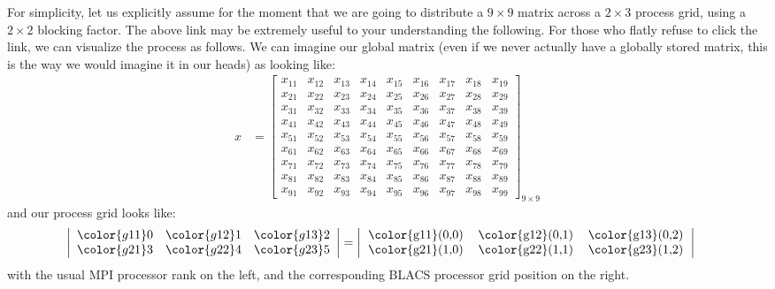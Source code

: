 For simplicity, let us explicitly assume for the moment that we are going to distribute a $9\times 9$ matrix across a $2\times 3$ process grid, using a $2\times 2$ blocking factor.  The above link may be extremely useful to your understanding the following.  For those who flatly refuse to click the link, we can visualize the process as follows.  We can imagine our global matrix (even if we never actually have a globally stored matrix, this is the way we would imagine it in our heads) as looking like:
\begin{align*}
x &= \left[
      \begin{array}{lllllllll}
      x_{11} & x_{12} & x_{13} & x_{14} & x_{15} & x_{16} & x_{17} & x	_{18} & x_{19}\\
      x_{21} & x_{22} & x_{23} & x_{24} & x_{25} & x_{26} & x_{27} & x	_{28} & x_{29}\\
      x_{31} & x_{32} & x_{33} & x_{34} & x_{35} & x_{36} & x_{37} & x	_{38} & x_{39}\\
      x_{41} & x_{42} & x_{43} & x_{44} & x_{45} & x_{46} & x_{47} & x	_{48} & x_{49}\\
      x_{51} & x_{52} & x_{53} & x_{54} & x_{55} & x_{56} & x_{57} & x	_{58} & x_{59}\\
      x_{61} & x_{62} & x_{63} & x_{64} & x_{65} & x_{66} & x_{67} & x	_{68} & x_{69}\\
      x_{71} & x_{72} & x_{73} & x_{74} & x_{75} & x_{76} & x_{77} & x	_{78} & x_{79}\\
      x_{81} & x_{82} & x_{83} & x_{84} & x_{85} & x_{86} & x_{87} & x	_{88} & x_{89}\\
      x_{91} & x_{92} & x_{93} & x_{94} & x_{95} & x_{96} & x_{97} & x	_{98} & x_{99}
      \end{array}
\right]_{9\times 9}
\end{align*}
and our process grid looks like:
\begin{align*}
\left|
      \begin{array}{lll}
      \color{g11}0 & \color{g12}1 & \color{g13}2\\
      \color{g21}3 & \color{g22}4 & \color{g23}5
      \end{array}
\right| &= 
\left|
      \begin{tabular}{lll}
      \color{g11}(0,0) & \color{g12}(0,1) & \color{g13}(0,2)\\
      \color{g21}(1,0) & \color{g22}(1,1) & \color{g23}(1,2)
      \end{tabular}
\right|
\end{align*}
with the usual MPI processor rank on the left, and the corresponding BLACS processor grid position on the right.

